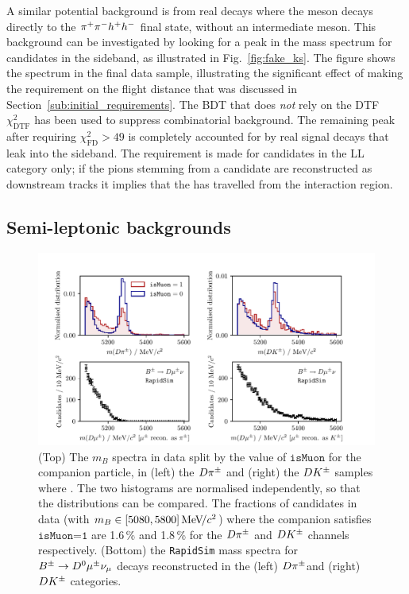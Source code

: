A similar potential background is from real \BtoDh decays where the \D meson decays directly to the ${{\pi}^+}{{\pi}^-} h^+ h^-$ final state, without an intermediate \KS meson. This background can be investigated by looking for a peak in the \B mass spectrum for candidates in the \KS sideband, as illustrated in Fig.~\ref{fig:fake_ks}. The figure shows the spectrum in the final data sample, illustrating the significant effect of making the requirement on the \KS flight distance that was discussed in Section~\ref{sub:initial_requirements}. The BDT that does \emph{not} rely on the DTF $\chi^2_\mathrm{DTF}$ has been used to suppress combinatorial background. The remaining peak after requiring $\chi^2_\text{FD}>49$ is completely accounted for by real signal decays that leak into the \KS sideband. The requirement is made for candidates in the LL category only; if the pions stemming from a \KS candidate are reconstructed as downstream tracks it implies that the \KS has travelled from the interaction region.


\subsection{Semi-leptonic backgrounds} %
\label{sub:semi_leptonic_backgrounds}

\begin{figure}[tb]
    \centering
    \includegraphics[width=\columnwidth]{figures/analysis/background_checks/b2dmunu_plot.pdf}
    \caption{(Top) The $m_B$ spectra in data split by the value of $\texttt{isMuon}$ for the companion particle, in (left) the $D\pi^\pm$ and (right) the ${{D}{{K}^\pm}}$ samples where \DtoKspipi. The two histograms are normalised independently, so that the distributions can be compared. The fractions of candidates in data (with $m_B\in[5080, 5800]\text{\,Me\kern -0.1em V\!/}c^2$) where the companion satisfies $\texttt{isMuon=1}$ are 1.6\,\% and 1.8\,\% for the $D\pi^\pm$ and ${{D}{{K}^\pm}}$ channels respectively. (Bottom) the \texttt{RapidSim} mass spectra for ${{B}^\pm}\rightarrow{\ensuremath{{D}^0}}{\ensuremath{\mu^\pm}}\nu_\mu$ decays reconstructed in the (left) $D\pi^\pm $and (right) ${{D}{{K}^\pm}}$ categories.}
    \label{fig:semileptonic_B_check_mu}
\end{figure}


